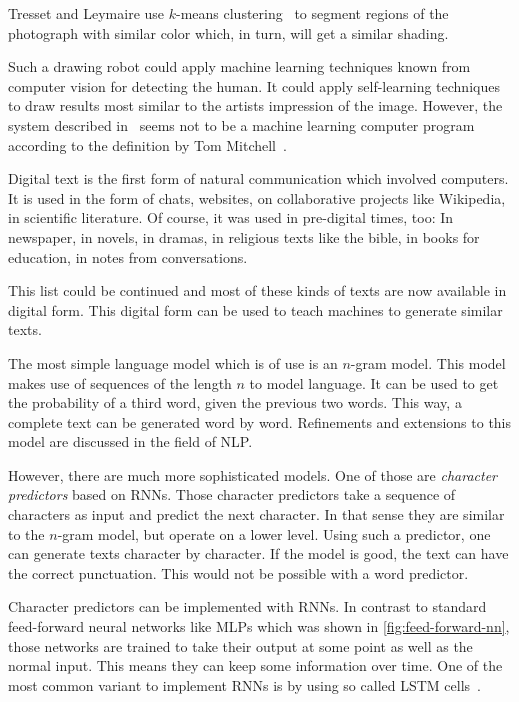 \documentclass[technote,a4paper,leqno]{IEEEtran}
\begin{document}
Tresset and Leymaire use $k$-means clustering~\cite{1017616} to segment regions
of the photograph with similar color which, in turn, will get a similar
shading.

Such a drawing robot could apply machine learning techniques known from
computer vision for detecting the human. It could apply self-learning
techniques to draw results most similar to the artists impression of the image.
However, the system described in~\cite{tresset2005generative} seems not to be a
machine learning computer program according to the definition by Tom
Mitchell~\cite{Mitchell97}.


Digital text is the first form of natural communication which involved
computers. It is used in the form of chats, websites, on collaborative projects
like Wikipedia, in scientific literature. Of course, it was used in pre-digital
times, too: In newspaper, in novels, in dramas, in religious texts like the
bible, in books for education, in notes from conversations.

This list could be continued and most of these kinds of texts are now available
in digital form. This digital form can be used to teach machines to generate
similar texts.

The most simple language model which is of use is an $n$-gram model. This model
makes use of sequences of the length $n$ to model language. It can be used to
get the probability of a third word, given the previous two words. This way, a
complete text can be generated word by word. Refinements and extensions to this
model are discussed in the field of \gls{NLP}.

However, there are much more sophisticated models. One of those are
\textit{character predictors} based on \glspl{RNN}. Those character predictors
take a sequence of characters as input and predict the next character. In that
sense they are similar to the $n$-gram model, but operate on a lower level.
Using such a predictor, one can generate texts character by character. If the
model is good, the text can have the correct punctuation. This would not be
possible with a word predictor.

Character predictors can be implemented with \glspl{RNN}. In contrast to
standard feed-forward neural networks like \glspl{MLP} which was shown in
\cref{fig:feed-forward-nn}, those networks are trained to take their output at
some point as well as the normal input. This means they can keep some
information over time. One of the most common variant to implement \glspl{RNN}
is by using so called \gls{LSTM} cells~\cite{hochreiter1997long}.
\end{document}
